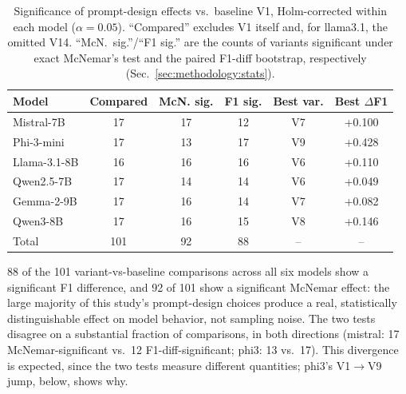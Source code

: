 \begin{table}[t]
\centering
\footnotesize
\caption{Significance of prompt-design effects vs.\ baseline V1,
Holm-corrected within each model ($\alpha=0.05$). ``Compared'' excludes
V1 itself and, for llama3.1, the omitted V14. ``McN.\ sig.''/``F1 sig.''
are the counts of variants significant under exact McNemar's test and
the paired F1-diff bootstrap, respectively (Sec.~\ref{sec:methodology:stats}).}
\label{tab:significance}
\setlength{\tabcolsep}{4pt}
\begin{tabular}{lccccc}
\toprule
Model & Compared & McN. sig. & F1 sig. & Best var. & Best $\Delta$F1 \\
\midrule
Mistral-7B & 17 & 17 & 12 & V7 & +0.100 \\
Phi-3-mini & 17 & 13 & 17 & V9 & +0.428 \\
Llama-3.1-8B & 16 & 16 & 16 & V6 & +0.110 \\
Qwen2.5-7B & 17 & 14 & 14 & V6 & +0.049 \\
Gemma-2-9B & 17 & 16 & 14 & V7 & +0.082 \\
Qwen3-8B & 17 & 16 & 15 & V8 & +0.146 \\
\midrule
Total & 101 & 92 & 88 & -- & -- \\
\bottomrule
\end{tabular}
\end{table}

88 of the 101 variant-vs-baseline comparisons across all six models
show a significant F1 difference, and 92 of 101 show a significant
McNemar effect: the large majority of this study's prompt-design choices
produce a real, statistically distinguishable effect on model behavior,
not sampling noise. The two tests disagree on a substantial fraction of
comparisons, in both directions (mistral: 17 McNemar-significant vs.\ 12
F1-diff-significant; phi3: 13 vs.\ 17). This divergence is expected,
since the two tests measure different quantities; phi3's V1$\to$V9 jump,
below, shows why.

